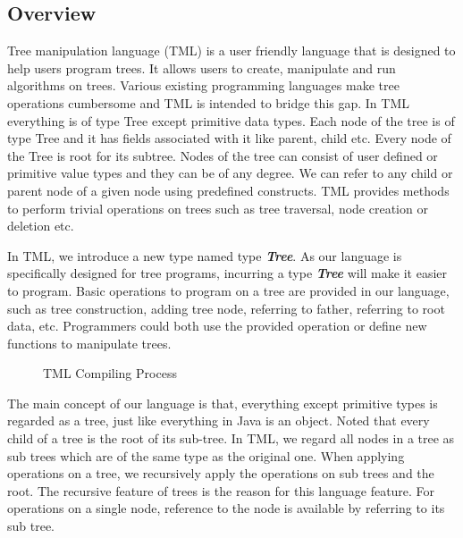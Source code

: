 \documentclass[12pt,psfig,a4]{article}
\begin{document}
\subsection{Overview}
Tree manipulation language (TML) is a user friendly language that is designed to help users program trees. It allows users to create, manipulate and run algorithms on trees. Various existing programming languages make tree operations cumbersome and TML is intended to bridge this gap. In TML everything is of type Tree except primitive data types. Each node of the tree is of type Tree and it has fields associated with it like parent, child etc. Every node of the Tree is root for its subtree. Nodes of the tree can consist of user defined or primitive value types and they can be of any degree. We can refer to any child or parent node of a given node using predefined constructs. TML provides methods to perform trivial operations on trees such as tree traversal, node creation or deletion etc.

In TML, we introduce a new type named type \textbf{\emph{Tree}}. As our language is specifically designed for tree programs, incurring a type \textbf{\emph{Tree}} will make it easier to program. Basic operations to program on a tree are provided in our language, such as tree construction, adding tree node, referring to father, referring to root data, etc. Programmers could both use the provided operation or define new functions to manipulate trees.

\begin{figure}[hb]
{\centering {} \par}
\caption{TML Compiling Process}
\label{TCP}
\end{figure}

The main concept of our language is that, everything except primitive types is regarded as a tree, just like everything in Java is an object. Noted that every child of a tree is the root of its sub-tree. In TML, we regard all nodes in a tree as sub trees which are of the same type as the original one. When applying operations on a tree, we recursively apply the operations on sub trees and the root. The recursive feature of trees is the reason for this language feature. For operations on a single node, reference to the node is available by referring to its sub tree.
\end{document}
